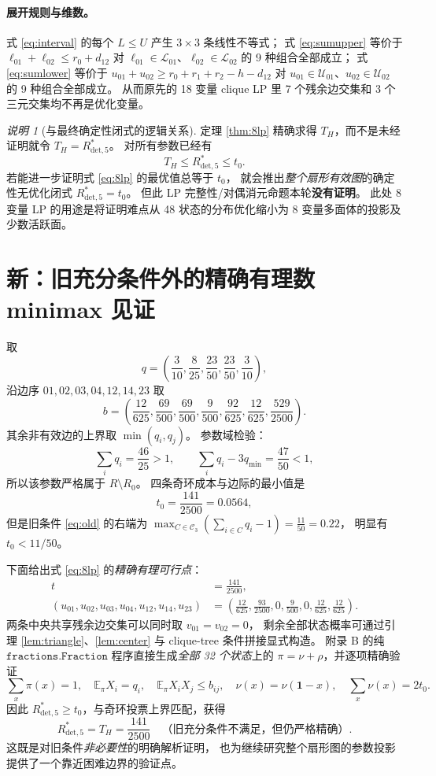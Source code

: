 \documentclass[11pt,a4paper]{ctexart}
\theoremstyle{remark}\newtheorem{remark}[theorem]{说明}
\newcommand{\Rdet}{R^*_{\mathrm{det},5}}
\newcommand{\Tc}{T_H}
\newcommand{\bx}{\boldsymbol 1}
\newcommand{\EE}{\mathbb E}
\begin{document}
\paragraph{展开规则与维数。}
式 \eqref{eq:interval} 的每个 $L\le U$ 产生 $3\times3$ 条线性不等式；
式 \eqref{eq:sumupper} 等价于
$\ell_{01}+\ell_{02}\le r_0+d_{12}$
对 $\ell_{01}\in\mathcal L_{01}$、$\ell_{02}\in\mathcal L_{02}$ 的
9 种组合全部成立；
式 \eqref{eq:sumlower} 等价于
$u_{01}+u_{02}\ge r_0+r_1+r_2-h-d_{12}$
对 $u_{01}\in\mathcal U_{01}$、$u_{02}\in\mathcal U_{02}$ 的 9 种组合全部成立。
从而原先的 18 变量 clique LP 里 7 个残余边交集和 3 个三元交集均不再是优化变量。

\begin{remark}[与最终确定性闭式的逻辑关系]
定理 \ref{thm:8lp} 精确求得 $T_H$，而不是未经证明就令 $T_H=\Rdet$。
对所有参数已经有
\[
\Tc\le\Rdet\le t_0.
\]
若能进一步证明式 \eqref{eq:8lp} 的最优值总等于 $t_0$，
就会推出\emph{整个扇形有效图}的确定性无优化闭式
$\Rdet=t_0$。
但此 LP 完整性/对偶消元命题本轮\textbf{没有证明}。
此处 8 变量 LP 的用途是将证明难点从 48 状态的分布优化缩小为
8 变量多面体的投影及少数活跃面。
\end{remark}

\section{新：旧充分条件外的精确有理数 minimax 见证}
\label{sec:example}
取
\[
q=\left(\frac3{10},\frac8{25},\frac{23}{50},\frac{23}{50},\frac3{10}\right),
\]
沿边序 $01,02,03,04,12,14,23$ 取
\[
b=\left(\frac{12}{625},\frac{69}{500},\frac{69}{500},
\frac9{500},\frac{92}{625},\frac{12}{625},\frac{529}{2500}\right).
\]
其余非有效边的上界取 $\min(q_i,q_j)$。
参数域检验：
\[
\sum_iq_i=\frac{46}{25}>1,\qquad
\sum_iq_i-3q_{\min}=\frac{47}{50}<1,
\]
所以该参数严格属于 $R\setminus R_0$。
四条奇环成本与边际的最小值是
\[
\boxed{t_0=\frac{141}{2500}=0.0564},
\]
但是旧条件 \eqref{eq:old} 的右端为
$\displaystyle \max_{C\in\mathcal C_3}(\sum_{i\in C}q_i-1)=\frac{11}{50}=0.22$，
明显有 $t_0<11/50$。

下面给出式 \eqref{eq:8lp} 的\emph{精确有理可行点}：
\[
\begin{aligned}
t&=\frac{141}{2500},\\
(u_{01},u_{02},u_{03},u_{04},u_{12},u_{14},u_{23})
&=\left(\frac{12}{625},\frac{93}{2500},0,\frac9{500},0,
\frac{12}{625},\frac{12}{625}\right).
\end{aligned}
\]
两条中央共享残余边交集可以同时取 $v_{01}=v_{02}=0$，
剩余全部状态概率可通过引理 \ref{lem:triangle}、\ref{lem:center}
与 clique-tree 条件拼接显式构造。
附录 B 的纯 $\texttt{fractions.Fraction}$ 程序直接生成\emph{全部 32 个状态}上的
$\pi=\nu+\rho$，并逐项精确验证
\[
\sum_x\pi(x)=1,\quad \EE_\pi X_i=q_i,\quad
\EE_\pi X_iX_j\le b_{ij},\quad
\nu(x)=\nu(\bx-x),\quad\sum_x\nu(x)=2t_0.
\]
因此 $\Rdet\ge t_0$，与奇环投票上界匹配，获得
\[
\boxed{\Rdet=\Tc=\frac{141}{2500}}
\quad\text{（旧充分条件不满足，但仍严格精确）}.
\]
这既是对旧条件\emph{非必要性}的明确解析证明，
也为继续研究整个扇形图的参数投影提供了一个靠近困难边界的验证点。
\end{document}
